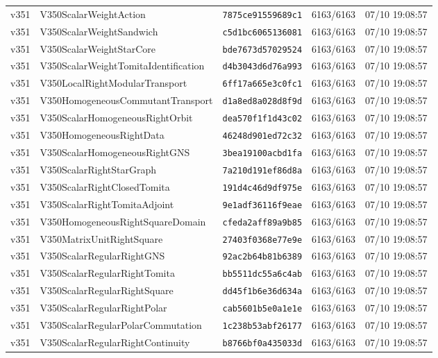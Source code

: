 \documentclass[11pt]{article}
\theoremstyle{definition}\newtheorem{deriv}{Derivação}
\begin{document}
{\begin{longtable}{@{}lllll@{}}
v351 & V350ScalarWeightAction & \texttt{7875ce91559689c1} & 6163/6163 & 07/10 19:08:57 \\
v351 & V350ScalarWeightSandwich & \texttt{c5d1bc6065136081} & 6163/6163 & 07/10 19:08:57 \\
v351 & V350ScalarWeightStarCore & \texttt{bde7673d57029524} & 6163/6163 & 07/10 19:08:57 \\
v351 & V350ScalarWeightTomitaIdentification & \texttt{d4b3043d6d76a993} & 6163/6163 & 07/10 19:08:57 \\
v351 & V350LocalRightModularTransport & \texttt{6ff17a665e3c0fc1} & 6163/6163 & 07/10 19:08:57 \\
v351 & V350HomogeneousCommutantTransport & \texttt{d1a8ed8a028d8f9d} & 6163/6163 & 07/10 19:08:57 \\
v351 & V350ScalarHomogeneousRightOrbit & \texttt{dea570f1f1d43c02} & 6163/6163 & 07/10 19:08:57 \\
v351 & V350HomogeneousRightData & \texttt{46248d901ed72c32} & 6163/6163 & 07/10 19:08:57 \\
v351 & V350ScalarHomogeneousRightGNS & \texttt{3bea19100acbd1fa} & 6163/6163 & 07/10 19:08:57 \\
v351 & V350ScalarRightStarGraph & \texttt{7a210d191ef86d8a} & 6163/6163 & 07/10 19:08:57 \\
v351 & V350ScalarRightClosedTomita & \texttt{191d4c46d9df975e} & 6163/6163 & 07/10 19:08:57 \\
v351 & V350ScalarRightTomitaAdjoint & \texttt{9e1adf36116f9eae} & 6163/6163 & 07/10 19:08:57 \\
v351 & V350HomogeneousRightSquareDomain & \texttt{cfeda2aff89a9b85} & 6163/6163 & 07/10 19:08:57 \\
v351 & V350MatrixUnitRightSquare & \texttt{27403f0368e77e9e} & 6163/6163 & 07/10 19:08:57 \\
v351 & V350ScalarRegularRightGNS & \texttt{92ac2b64b81b6389} & 6163/6163 & 07/10 19:08:57 \\
v351 & V350ScalarRegularRightTomita & \texttt{bb5511dc55a6c4ab} & 6163/6163 & 07/10 19:08:57 \\
v351 & V350ScalarRegularRightSquare & \texttt{dd45f1b6e36d634a} & 6163/6163 & 07/10 19:08:57 \\
v351 & V350ScalarRegularRightPolar & \texttt{cab5601b5e0a1e1e} & 6163/6163 & 07/10 19:08:57 \\
v351 & V350ScalarRegularPolarCommutation & \texttt{1c238b53abf26177} & 6163/6163 & 07/10 19:08:57 \\
v351 & V350ScalarRegularRightContinuity & \texttt{b8766bf0a435033d} & 6163/6163 & 07/10 19:08:57 \\

\end{longtable}}
\end{document}
